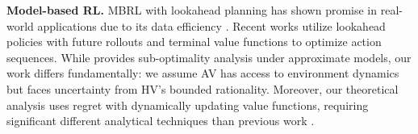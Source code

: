 {\bf Model-based RL.} MBRL with lookahead planning has shown promise in real-world applications due to its data efficiency \cite{moerland2023model}. Recent works \cite{sikchi2022learning,xiao2019learning} utilize lookahead policies with future rollouts and terminal value functions to optimize action sequences. While \cite{sikchi2022learning} provides sub-optimality analysis under approximate models, our work differs fundamentally: we assume AV has access to environment dynamics but faces uncertainty from HV's bounded rationality. Moreover, our theoretical analysis uses regret with dynamically updating value functions, requiring significant different analytical techniques than previous work \cite{xiao2019learning,sikchi2022learning,luo2022survey}.